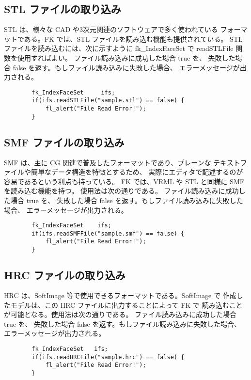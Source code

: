 \subsection{STL ファイルの取り込み}
STL は、様々な CAD や3次元関連のソフトウェアで多く使われている
フォーマットである。FK では、STL ファイルを読み込む機能も提供されている。
STL ファイルを読み込むには、次に示すように fk\_IndexFaceSet で
readSTLFile 関数を使用すればよい。
ファイル読み込みに成功した場合 true を、
失敗した場合 false を返す。もしファイル読み込みに失敗した場合、
エラーメッセージが出力される。
\\
\begin{screen}
\begin{verbatim}
        fk_IndexFaceSet     ifs;
        if(ifs.readSTLFile("sample.stl") == false) {
            fl_alert("File Read Error!");
        }
\end{verbatim}
\end{screen}
\subsection{SMF ファイルの取り込み}
SMF は、主に CG 関連で普及したフォーマットであり、プレーンな
テキストファイルや簡単なデータ構造を特徴とするため、
実際にエディタで記述するのが容易であるという利点も持っている。
FK では、VRML や STL と同様に SMF を読み込む機能を持つ。
使用法は次の通りである。
ファイル読み込みに成功した場合 true を、
失敗した場合 false を返す。もしファイル読み込みに失敗した場合、
エラーメッセージが出力される。
\\
\begin{screen}
\begin{verbatim}
        fk_IndexFaceSet    ifs;
        if(ifs.readSMFFile("sample.smf") == false) {
            fl_alert("File Read Error!");
        }
\end{verbatim}
\end{screen}
\subsection{HRC ファイルの取り込み}
HRC は、SoftImage 等で使用できるフォーマットである。SoftImage で
作成したモデルは、この HRC ファイルに出力することによって FK で
読み込むことが可能となる。使用法は次の通りである。
ファイル読み込みに成功した場合 true を、
失敗した場合 false を返す。もしファイル読み込みに失敗した場合、
エラーメッセージが出力される。
\\
\begin{screen}
\begin{verbatim}
        fk_IndexFaceSet   ifs;
        if(ifs.readHRCFile("sample.hrc") == false) {
            fl_alert("File Read Error!");
        }
\end{verbatim}
\end{screen}
